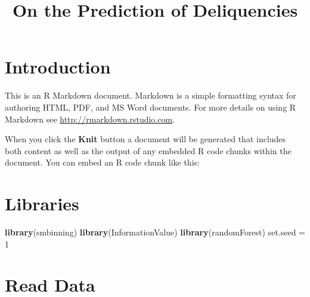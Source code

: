 \documentclass[
]{article}
\title{On the Prediction of Deliquencies}
\author{}
\date{\vspace{-2.5em}}
\newenvironment{Shaded}{\begin{snugshade}}{\end{snugshade}}
\newcommand{\DecValTok}[1]{\textcolor[rgb]{0.00,0.00,0.81}{#1}}
\newcommand{\KeywordTok}[1]{\textcolor[rgb]{0.13,0.29,0.53}{\textbf{#1}}}
\newcommand{\NormalTok}[1]{#1}
\newcommand{\StringTok}[1]{\textcolor[rgb]{0.31,0.60,0.02}{#1}}
\begin{document}
\maketitle

\hypertarget{introduction}{%
\section{Introduction}\label{introduction}}

This is an R Markdown document. Markdown is a simple formatting syntax
for authoring HTML, PDF, and MS Word documents. For more details on
using R Markdown see \url{http://rmarkdown.rstudio.com}.

When you click the \textbf{Knit} button a document will be generated
that includes both content as well as the output of any embedded R code
chunks within the document. You can embed an R code chunk like this:

\hypertarget{libraries}{%
\section{Libraries}\label{libraries}}

\begin{Shaded}
\begin{Highlighting}[]
\KeywordTok{library}\NormalTok{(smbinning)}
\KeywordTok{library}\NormalTok{(InformationValue)}
\KeywordTok{library}\NormalTok{(randomForest)}
\NormalTok{set.seed =}\StringTok{ }\DecValTok{1}
\end{Highlighting}
\end{Shaded}

\hypertarget{read-data}{%
\section{Read Data}\label{read-data}}
\end{document}
